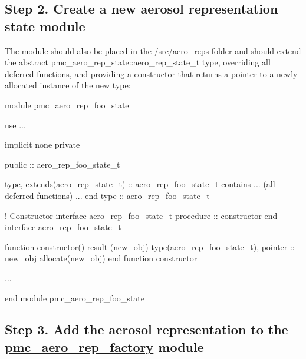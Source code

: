\subsection*{Step 2. Create a new aerosol representation state module}

The module should also be placed in the {\ttfamily /src/aero\+\_\+reps} folder and should extend the abstract {\ttfamily pmc\+\_\+aero\+\_\+rep\+\_\+state\+::aero\+\_\+rep\+\_\+state\+\_\+t} type, overriding all deferred functions, and providing a constructor that returns a pointer to a newly allocated instance of the new type\+:


\begin{DoxyCode}
\textcolor{keyword}{module} pmc\_aero\_rep\_foo\_state

  \textcolor{keywordtype}{use }...

  \textcolor{keywordtype}{implicit none}
  \textcolor{keywordtype}{private}

  \textcolor{keywordtype}{public} :: aero\_rep\_foo\_state\_t

  \textcolor{keyword}{type}, \textcolor{keyword}{extends}(aero\_rep\_state\_t) :: aero\_rep\_foo\_state\_t
  \textcolor{keyword}{contains}
    ... (all \textcolor{keywordtype}{deferred} functions) ...
\textcolor{keyword}{  end type }:: aero\_rep\_foo\_state\_t
  
  \textcolor{comment}{! Constructor}
  \textcolor{keyword}{interface} aero\_rep\_foo\_state\_t
    \textcolor{keywordtype}{procedure} :: constructor
\textcolor{keyword}{  end interface }aero\_rep\_foo\_state\_t

\textcolor{keyword}{  function }\mbox{\hyperlink{namespacepmc__aero__phase__data_ae2a9e6bfb1747e2ace93ab3fadd55530}{constructor}}() \textcolor{keyword}{result} (new\_obj)
    \textcolor{keywordtype}{type}(aero\_rep\_foo\_state\_t), \textcolor{keywordtype}{pointer} :: new\_obj
    \textcolor{keyword}{allocate}(new\_obj)
\textcolor{keyword}{  end function }\mbox{\hyperlink{namespacepmc__aero__phase__data_ae2a9e6bfb1747e2ace93ab3fadd55530}{constructor}}

  ...

\textcolor{keyword}{end module }pmc\_aero\_rep\_foo\_state
\end{DoxyCode}


\subsection*{Step 3. Add the aerosol representation to the {\ttfamily \mbox{\hyperlink{namespacepmc__aero__rep__factory}{pmc\+\_\+aero\+\_\+rep\+\_\+factory}}} module}


